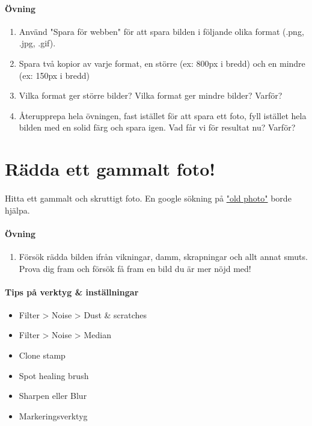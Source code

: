 \documentclass{article}
\begin{document}
    \paragraph{Övning}
      \begin{enumerate}
        \item Använd "Spara för webben" för att spara bilden i följande olika format (.png, .jpg, .gif).
        \item Spara två kopior av varje format, en större (ex: 800px i bredd) och en mindre (ex: 150px i bredd)
        \item Vilka format ger större bilder? Vilka format ger mindre bilder? Varför?
        \item Återupprepa hela övningen, fast istället för att spara ett foto, fyll istället hela bilden med en solid färg och spara igen. Vad får vi för resultat nu? Varför?
      \end{enumerate}


  \section{Rädda ett gammalt foto!}
    \paragraph{}
    Hitta ett gammalt och skruttigt foto. En google sökning på \href{https://www.google.se/search?biw=1680&bih=882&q=dusty+old+photo&bav=on.2,or.r_qf.&bvm=bv.51495398,d.ZG4,pv.xjs.s.en_US.M4-36_38X9A.O&um=1&ie=UTF-8&hl=sv&tbm=isch&source=og&sa=N&tab=wi&ei=cKEkUuzdHYGVhQeytYC4Bw#hl=sv&q=old+photograph&tbm=isch&um=1}{"old photo"} borde hjälpa.
    
    \paragraph{Övning}
      \begin{enumerate}
        \item Försök rädda bilden ifrån vikningar, damm, skrapningar och allt annat smuts. Prova dig fram och försök få fram en bild du är mer nöjd med!
      \end{enumerate} 

    \paragraph{Tips på verktyg \& inställningar}
      \begin{itemize}
        \item Filter > Noise > Dust \& scratches
        \item Filter > Noise > Median
        \item Clone stamp
        \item Spot healing brush
        \item Sharpen eller Blur
        \item Markeringsverktyg
      \end{itemize}
\end{document}
